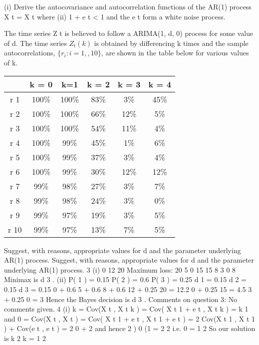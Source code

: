 \documentclass[a4paper,12pt]{article}
\begin{document}
(i)
Derive the autocovariance and autocorrelation functions of the AR(1) process
X t = X t
where
(ii)
1
+ e t
< 1 and the e t form a white noise process.


The time series Z t is believed to follow a ARIMA(1, d, 0) process for some value of d. The time series $Z_t ( k )$ is obtained by differencing k times and the sample autocorrelations, $\{r_i : i = 1, , 10\}$, are shown in the table below for
various values of k.
\begin{center}
\begin{tabular}{cc|cc|cc}
	&	k = 0	&	k=1	&	k = 2	&	k = 3	&	k = 4	\\ \hline
r 1	&	100\%	&	100\%	&	83\%	&	3\%	&	45\%	\\ \hline
r 2	&	100\%	&	100\%	&	66\%	&	12\%	&	5\%	\\ \hline
r 3	&	100\%	&	100\%	&	54\%	&	11\%	&	4\%	\\ \hline
r 4	&	100\%	&	99\%	&	45\%	&	1\%	&	6\%	\\ \hline
r 5	&	100\%	&	99\%	&	37\%	&	3\%	&	4\%	\\ \hline
r 6	&	100\%	&	99\%	&	30\%	&	12\%	&	12\%	\\ \hline
r 7	&	99\%	&	98\%	&	27\%	&	3\%	&	7\%	\\ \hline
r 8	&	99\%	&	98\%	&	24\%	&	3\%	&	0\%	\\ \hline
r 9	&	99\%	&	97\%	&	19\%	&	3\%	&	5\%	\\ \hline
r 10	&	99\%	&	97\%	&	13\%	&	7\%	&	5\%	\\ \hline
\end{tabular}
\end{center}
Suggest, with reasons, appropriate values for d and the parameter
underlying AR(1) process.
Suggest, with reasons, appropriate values for d and the parameter
underlying AR(1) process.
3
(i)
0
12
20
Maximum loss: 20
5
0
15
15
8
3
0
8
Minimax is d 3 .
(ii)
P( 1 ) = 0.15
P( 2 ) = 0.6
P( 3 ) = 0.25
d 1 = 0.15
d 2 = 0.15
d 3 = 0.15
0 + 0.6
5 + 0.6
8 + 0.6
12 + 0.25 20 = 12.2
0 + 0.25 15 = 4.5
3 + 0.25 0 = 3
Hence the Bayes decision is d 3 .
Comments on question 3: No comments given.
4
(i)
k
= Cov(X t , X t k )
= Cov( X t 1 + e t , X t k )
= k 1
and
0
= Cov(X t , X t )
= Cov( X t 1 + e t , X t 1 + e t )
= 2 Cov(X t 1 , X t 1 ) + Cov(e t , e t )
= 2 0 + 2
and hence
2 )
0 (1
=
2
2
i.e.
0 =
1
2
So our solution is
k 2
k =
1
2
\end{document}
